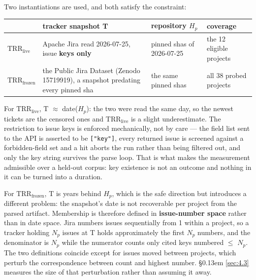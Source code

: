 \documentclass[conference]{IEEEtran}
\begin{document}
Two instantiations are used, and both satisfy the constraint:

\begin{table}[htbp]
\centering
\begingroup\footnotesize\setlength{\tabcolsep}{3pt}
\begin{tabular}{>{\raggedright\arraybackslash}p{}>{\raggedright\arraybackslash}p{}>{\raggedright\arraybackslash}p{}>{\raggedright\arraybackslash}p{}}
\toprule
\textbf{} & \textbf{tracker snapshot T} & \textbf{repository $H_p$} & \textbf{coverage} \\
\midrule
\textbf{$\mathrm{TRR}_\mathrm{live}$} & Apache Jira read 2026-\allowbreak{}07-\allowbreak{}25, issue \textbf{keys only} & pinned shas of 2026-\allowbreak{}07-\allowbreak{}25 & the 12 eligible projects \\
\textbf{$\mathrm{TRR}_\mathrm{frozen}$} & the Public Jira Dataset \cite{montgomery2025jira} (Zenodo 15719919), a snapshot predating every pinned sha & the same pinned shas & all 38 probed projects \\
\bottomrule
\end{tabular}
\endgroup
\end{table}

For \textbf{$\mathrm{TRR}_\mathrm{live}$}, T $\approx$ date($H_p$): the two were read the same day, so the newest tickets are the censored ones and $\mathrm{TRR}_\mathrm{live}$ is a slight underestimate. The restriction to issue keys is enforced mechanically, not by care --- the field list sent to the API is asserted to be \texttt{["key"]}, every returned issue is screened against a forbidden-field set and a hit aborts the run rather than being filtered out, and only the key string survives the parse loop. That is what makes the measurement admissible over a held-out corpus: key existence is not an outcome and nothing in it can be turned into a duration.

For \textbf{$\mathrm{TRR}_\mathrm{frozen}$}, T is years behind $H_p$, which is the safe direction but introduces a different problem: the snapshot's date is not recoverable per project from the parsed artifact. Membership is therefore defined in \textbf{issue-number space} rather than in date space. Jira numbers issues sequentially from 1 within a project, so a tracker holding $N_p$ issues at T holds approximately the first $N_p$ numbers, and the denominator is $N_p$ while the numerator counts only cited keys numbered $\leq$ $N_p$. The two definitions coincide except for issues moved between projects, which perturb the correspondence between count and highest number. \S\kern0.13em \ref{sec:4.3} measures the size of that perturbation rather than assuming it away.
\end{document}
